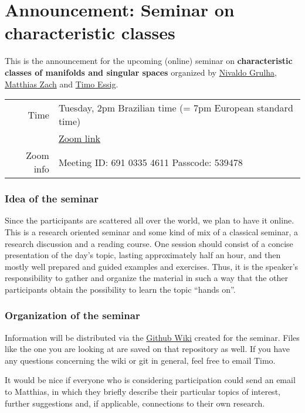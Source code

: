 \documentclass[a4paper]{article}
\begin{document}
\section*{Announcement: Seminar on characteristic classes}

This is the announcement for the upcoming (online) seminar on 
\textbf{characteristic classes of manifolds and singular spaces}
organized by 
\href{mailto:njunior@icmc.usp.br}{Nivaldo Grulha}, 
\href{mailto:zach@math.uni-hannover.de}{Matthias Zach} and 
\href{mailto:essig@math.uni-kiel.de}{Timo Essig}.

\begin{center}
	\begin{tabular}{rl}
		Time & Tuesday, 2pm Brazilian time (= 7pm European standard time) \\
			&  \href{https://uni-kiel.zoom.us/j/69103354611?pwd=TUlmeGZQNlVPSG5YcEtDdndDU1kydz09}{Zoom link} \\
		Zoom info	& Meeting ID: 691 0335 4611 Passcode: 539478
	\end{tabular}
\end{center}

\subsubsection*{Idea of the seminar} 
Since the participants are scattered all over the world, 
we plan to have it online. 
This is a research oriented seminar and some kind of mix of a classical seminar,
a research discussion and a reading course.
One session should consist of a concise presentation of the 
day's topic, lasting approximately half an hour, and then mostly well prepared and 
guided examples and exercises. Thus, it is the speaker's responsibility to gather 
and organize the material in such a way that the other participants obtain the 
possibility to learn the topic ``hands on''. 

\subsubsection*{Organization of the seminar}
Information will be distributed via the 
\href{https://github.com/timoessig/CCSingSem/wiki}{Github Wiki}
created for the seminar. Files like the one you are looking at are saved on that
repository as well. If you have any questions concerning the wiki or git in general,
feel free to email Timo.

It would be nice if everyone who is considering participation could send an 
email to Matthias, in which they briefly describe 
their particular topics of interest, further suggestions and, if applicable, 
connections to their own research. 
\end{document}
